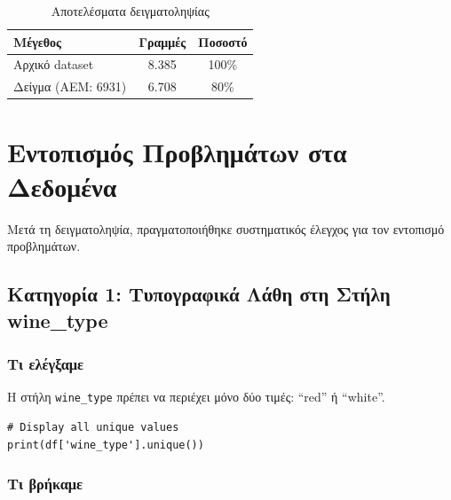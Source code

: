 \documentclass[12pt,a4paper]{article}
\begin{document}
\begin{table}[H]
\centering
\caption{\textgreek{Αποτελέσματα δειγματοληψίας}}
\begin{tabular}{@{}lcc@{}}
\toprule
\textbf{\textgreek{Μέγεθος}} & \textbf{\textgreek{Γραμμές}} & \textbf{\textgreek{Ποσοστό}} \\
\midrule
\textgreek{Αρχικό dataset} & 8.385 & 100\% \\
\textgreek{Δείγμα (ΑΕΜ: 6931)} & 6.708 & 80\% \\
\bottomrule
\end{tabular}
\end{table}

\section{\textgreek{Εντοπισμός Προβλημάτων στα Δεδομένα}}

\textgreek{Μετά τη δειγματοληψία, πραγματοποιήθηκε συστηματικός έλεγχος για τον εντοπισμό προβλημάτων.}

\subsection{\textgreek{Κατηγορία 1: Τυπογραφικά Λάθη στη Στήλη wine\_type}}

\subsubsection{\textgreek{Τι ελέγξαμε}}

\textgreek{Η στήλη} \texttt{wine\_type} \textgreek{πρέπει να περιέχει μόνο δύο τιμές: ``red'' ή ``white''.}

\begin{lstlisting}[caption={Check unique values}]
# Display all unique values
print(df['wine_type'].unique())
\end{lstlisting}

\subsubsection{\textgreek{Τι βρήκαμε}}
\end{document}
